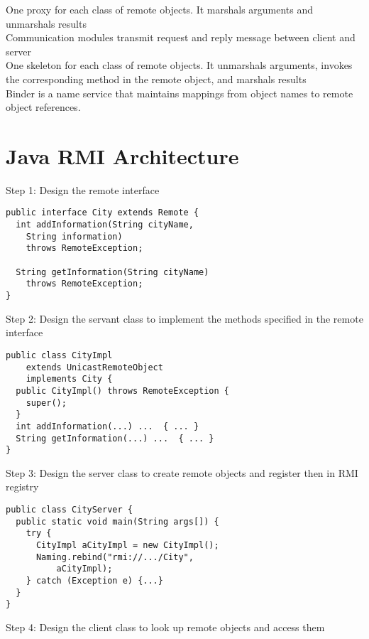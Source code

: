 \begin{multicols*}{2}
\noindent One proxy for each class of remote objects. It marshals arguments and unmarshals results\\

\noindent Communication modules transmit request and reply message between client and server\\

\noindent One skeleton for each class of remote objects. It unmarshals arguments, invokes the corresponding method in the remote object, and marshals results\\

\noindent Binder is a name service that maintains mappings from object names to remote object references.

\section{Java RMI Architecture}

\noindent Step 1: Design the remote interface

\begin{verbatim}
public interface City extends Remote {
  int addInformation(String cityName, 
    String information)
    throws RemoteException;

  String getInformation(String cityName)
    throws RemoteException;
}
\end{verbatim}

\noindent Step 2: Design the servant class to implement the methods specified in the remote interface

\begin{verbatim}
public class CityImpl
    extends UnicastRemoteObject
    implements City {
  public CityImpl() throws RemoteException {
    super();
  }
  int addInformation(...) ...  { ... }
  String getInformation(...) ...  { ... }
}
\end{verbatim}

\noindent Step 3: Design the server class to create remote objects and register then in RMI registry

\begin{verbatim}
public class CityServer {
  public static void main(String args[]) {
    try {
      CityImpl aCityImpl = new CityImpl();
      Naming.rebind("rmi://.../City", 
          aCityImpl);
    } catch (Exception e) {...}
  }
}
\end{verbatim}

\noindent Step 4: Design the client  class to look up remote objects and access them


\end{multicols*}
